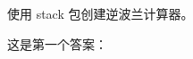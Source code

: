 \begin{Exercise}[title={计算器},difficulty=2]
\label{ex:calc}
\Question\label{ex:calc q1} 使用 stack 包创建逆波兰计算器。

\end{Exercise}

\begin{Answer}
\Question 这是第一个答案：

\end{Answer}
